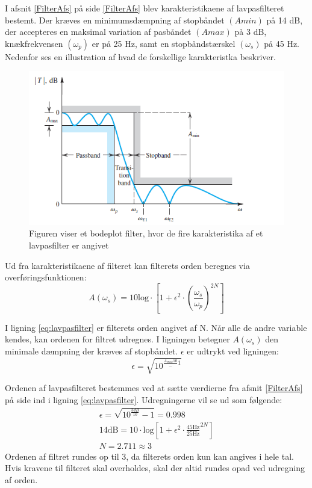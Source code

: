 I afsnit \ref{FilterAfs} på side \ref{FilterAfs} blev karakteristikaene af lavpasfilteret bestemt. Der kræves en minimumsdæmpning af stopbåndet $(Amin)$ på 14 dB, der accepteres en maksimal variation af pasbåndet $(Amax)$ på 3 dB, knækfrekvensen $(\omega _p)$ er på 25 Hz, samt en stopbåndstærskel $( \omega _s)$ på 45 Hz. Nedenfor ses en illustration af hvad de forskellige karakteristka beskriver.

\begin{figure}[H]
	\centering
	\includegraphics[scale=0.8]{figures/cProblemloesning/Lavpasfilter_generisk.PNG}
	\caption{Figuren viser et bodeplot filter, hvor de fire karakteristika af et lavpasfilter er angivet}
	\label{fig:Lavpasfilter_generisk}
\end{figure}

\noindent Ud fra karakteristikaene af filteret kan filterets orden beregnes via overføringsfunktionen:
\begin{equation} \label{eq:lavpasfilter}
A(\omega_s) = 10 \text{log} \cdot \left[1 + \epsilon^2 \cdot (\frac{\omega _s}{\omega _p})^{2N}\right] 
\end{equation}

\noindent I ligning \ref{eq:lavpasfilter} er filterets orden angivet af N. Når alle de andre variable kendes, kan ordenen for filtret udregnes. I ligningen betegner $A(\omega _s)$ den minimale dæmpning der kræves af stopbåndet. $\epsilon$ er udtrykt ved ligningen:
\begin{equation}
\epsilon = \sqrt{10^{\frac{A_{max}{10}} - 1}}
\end{equation}

Ordenen af lavpasfilteret bestemmes ved at sætte værdierne fra afsnit \ref{FilterAfs} på side \pageref{FilterAfs} ind i ligning \ref{eq:lavpasfilter}. Udregningerne vil se ud som følgende:
\begin{align}
\epsilon = \sqrt{10^{\frac{3dB}{10}} - 1} = 0.998 \\
14\text{dB} = 10 \cdot \text{log} \left[1 + \epsilon ^2 \cdot \frac{45\text{Hz}}{25\text{Hz}}^{2N}\right] \\
N = 2.711 \approx 3
\end{align}
\noindent Ordenen af filtret rundes op til 3, da filterets orden kun kan angives i hele tal. Hvis kravene til filteret skal overholdes, skal der altid rundes opad ved udregning af orden.

